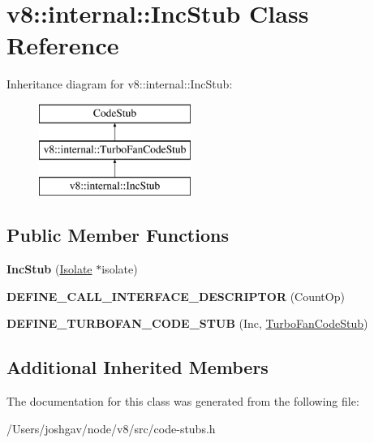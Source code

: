 \hypertarget{classv8_1_1internal_1_1_inc_stub}{}\section{v8\+:\+:internal\+:\+:Inc\+Stub Class Reference}
\label{classv8_1_1internal_1_1_inc_stub}
Inheritance diagram for v8\+:\+:internal\+:\+:Inc\+Stub\+:\begin{figure}[H]
\begin{center}
\leavevmode
\includegraphics[height=3.000000cm]{classv8_1_1internal_1_1_inc_stub}
\end{center}
\end{figure}
\subsection*{Public Member Functions}
\begin{DoxyCompactItemize}
\item 
{\bfseries Inc\+Stub} (\hyperlink{classv8_1_1internal_1_1_isolate}{Isolate} $\ast$isolate)\hypertarget{classv8_1_1internal_1_1_inc_stub_a36a8f8d40a016de5151cd70d8cd1351a}{}\label{classv8_1_1internal_1_1_inc_stub_a36a8f8d40a016de5151cd70d8cd1351a}

\item 
{\bfseries D\+E\+F\+I\+N\+E\+\_\+\+C\+A\+L\+L\+\_\+\+I\+N\+T\+E\+R\+F\+A\+C\+E\+\_\+\+D\+E\+S\+C\+R\+I\+P\+T\+OR} (Count\+Op)\hypertarget{classv8_1_1internal_1_1_inc_stub_a0003c52392768c73c8ddcf5d23390b77}{}\label{classv8_1_1internal_1_1_inc_stub_a0003c52392768c73c8ddcf5d23390b77}

\item 
{\bfseries D\+E\+F\+I\+N\+E\+\_\+\+T\+U\+R\+B\+O\+F\+A\+N\+\_\+\+C\+O\+D\+E\+\_\+\+S\+T\+UB} (Inc, \hyperlink{classv8_1_1internal_1_1_turbo_fan_code_stub}{Turbo\+Fan\+Code\+Stub})\hypertarget{classv8_1_1internal_1_1_inc_stub_a96f98427d0246e5ed32600401477027d}{}\label{classv8_1_1internal_1_1_inc_stub_a96f98427d0246e5ed32600401477027d}

\end{DoxyCompactItemize}
\subsection*{Additional Inherited Members}


The documentation for this class was generated from the following file\+:\begin{DoxyCompactItemize}
\item 
/\+Users/joshgav/node/v8/src/code-\/stubs.\+h\end{DoxyCompactItemize}
